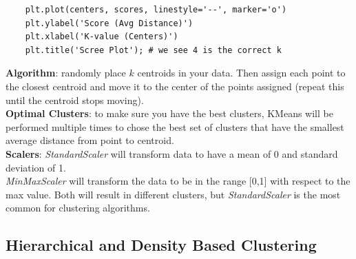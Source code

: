 \documentclass[11pt, a4paper]{article}
\begin{document}
\begin{spacing}{1.1}
\begin{lstlisting}
	plt.plot(centers, scores, linestyle='--', marker='o')
	plt.ylabel('Score (Avg Distance)')
	plt.xlabel('K-value (Centers)')
	plt.title('Scree Plot'); # we see 4 is the correct k
	\end{lstlisting} \vspace*{2mm}
	\textbf{Algorithm}: randomly place $k$ centroids in your data. Then assign each point to the closest centroid and move it to the center of the points assigned (repeat this until the centroid stops moving). \vspace*{2mm}\\
	\textbf{Optimal Clusters}: to make sure you have the best clusters, KMeans will be performed multiple times to chose the best set of clusters that have the smallest average distance from point to centroid.\vspace*{2mm}\\
	\textbf{Scalers}: \textit{StandardScaler} will transform data to have a mean of 0 and standard deviation of 1. \\ \textit{MinMaxScaler} will transform the data to be in the range [0,1] with respect to the max value. Both will result in different clusters, but \textit{StandardScaler} is the most common for clustering algorithms.\vspace*{2mm}
	
	\subsection{Hierarchical and Density Based Clustering}

\end{spacing}
\end{document}
